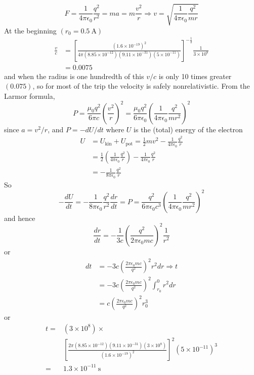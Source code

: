 \begin{answer}
$$
F=\frac{1}{4 \pi \epsilon_{0}} \frac{q^{2}}{r^{2}}=m a=m \frac{v^{2}}{r} \Rightarrow v=\sqrt{\frac{1}{4 \pi \epsilon_{0}} \frac{q^{2}}{m r}}
$$
At the beginning $\left(r_{0}=0.5 \mathrm{~A}\right)$
$$
\begin{aligned}
\frac{v}{c} &=\left[\frac{\left(1.6 \times 10^{-19}\right)^{2}}{4 \pi\left(8.85 \times 10^{-12}\right)\left(9.11 \times 10^{-31}\right)\left(5 \times 10^{-11}\right)}\right]^{-\frac{1}{2}} \frac{1}{3 \times 10^{8}} \\
&=0.0075
\end{aligned}
$$
and when the radius is one hundredth of this $v / c$ is only 10 times greater $(0.075)$, so for most of the trip the velocity is safely nonrelativistic. From the Larmor formula,
$$P=\frac{\mu_{0} q^{2}}{6 \pi c}\left(\frac{v^{2}}{r}\right)^{2}=\frac{\mu_{0} q^{2}}{6 \pi \epsilon_{0}}\left(\frac{1}{4 \pi \epsilon_{0}} \frac{q^{2}}{m r^{2}}\right)^{2}$$
since $a=v^{2} / r$, and $P=-d U / d t$ where $U$ is the (total) energy of the electron
$$
\begin{aligned}
	U &=U_{\mathrm{kin}}+U_{\mathrm{pot}}=\frac{1}{2} m v^{2}-\frac{1}{4 \pi \epsilon_{0}} \frac{q^{2}}{r} \\
	&=\frac{1}{2}\left(\frac{1}{4 \pi \epsilon_{0}} \frac{q^{2}}{r}\right)-\frac{1}{4 \pi \epsilon_{0}} \frac{q^{2}}{r} \\
	&=-\frac{1}{8 \pi \epsilon_{0}} \frac{q^{2}}{r}
\end{aligned}$$
So
$$
-\frac{d U}{d t}=-\frac{1}{8 \pi \epsilon_{0}} \frac{q^{2}}{r^{2}} \frac{d r}{d t}=P=\frac{q^{2}}{6 \pi \epsilon_{0} c^{3}}\left(\frac{1}{4 \pi \epsilon_{0}} \frac{q^{2}}{m r^{2}}\right)^{2}
$$
and hence
$$
\frac{d r}{d t}=-\frac{1}{3 c}\left(\frac{q^{2}}{2 \pi \epsilon_{0} m c}\right)^{2} \frac{1}{r^{2}}
$$
or
$$
\begin{aligned}
d t &=-3 c\left(\frac{2 \pi \epsilon_{0} m c}{q^{2}}\right)^{2} r^{2} d r \Rightarrow t \\
&=-3 c\left(\frac{2 \pi \epsilon_{0} m c}{q^{2}}\right)^{2} \int_{r_{0}}^{0} r^{2} d r \\
&=c\left(\frac{2 \pi \epsilon_{0} m c}{q^{2}}\right)^{2} r_{0}^{3}
\end{aligned}
$$
or
$$
\begin{aligned}
t=&\left(3 \times 10^{8}\right) \times \\
&\left[\frac{2 \pi\left(8.85 \times 10^{-12}\right)\left(9.11 \times 10^{-31}\right)\left(3 \times 10^{8}\right)}{\left(1.6 \times 10^{-19}\right)^{2}}\right]^{2}\left(5 \times 10^{-11}\right)^{3} \\
=& 1.3 \times 10^{-11} \mathrm{~s}
\end{aligned}
$$	
\end{answer}

